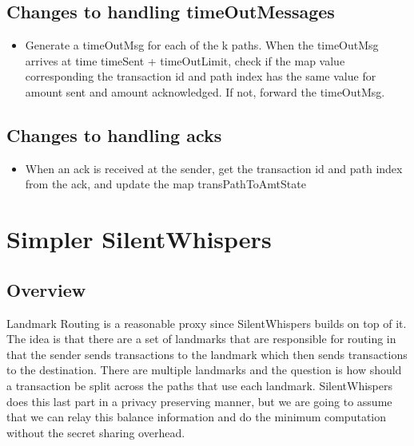 \documentclass[a4paper]{article}
\begin{document}
\subsection{Changes to handling timeOutMessages}
\begin{itemize}
    \item Generate a timeOutMsg for each of the k paths. When the timeOutMsg arrives at time timeSent + timeOutLimit, check if the map value corresponding the transaction id and path index has the same value for amount sent and amount acknowledged. If not, forward the timeOutMsg.
\end{itemize}
\subsection{Changes to handling acks}
\begin{itemize}
    \item When an ack is received at the sender, get the transaction id and path index from the ack, and update the map transPathToAmtState
\end{itemize}

\section{Simpler SilentWhispers}

\subsection{Overview}
Landmark Routing is a reasonable proxy since SilentWhispers builds on top of it. The idea is that there are a
set of landmarks that are responsible for routing in that the sender sends transactions to the landmark which 
then sends transactions to the destination. There are multiple landmarks and the question is how should a 
transaction be split across the paths that use each landmark. SilentWhispers does this last part in a privacy
preserving manner, but we are going to assume that we can relay this balance information and do the minimum
computation without the secret sharing overhead.
\end{document}
